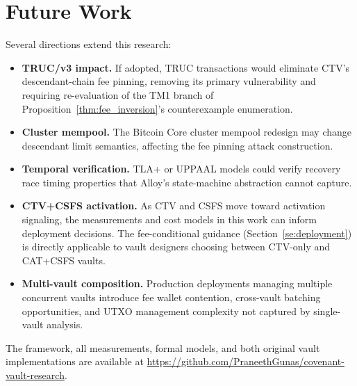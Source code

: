 \section{Future Work}

Several directions extend this research:

\begin{itemize}
\item \textbf{TRUC/v3 impact.} If adopted, TRUC transactions would eliminate CTV's
  descendant-chain fee pinning, removing its primary vulnerability and requiring
  re-evaluation of the TM1 branch of
  Proposition~\ref{thm:fee_inversion}'s counterexample enumeration.

\item \textbf{Cluster mempool.} The Bitcoin Core cluster mempool redesign may change
  descendant limit semantics, affecting the fee pinning attack construction.

\item \textbf{Temporal verification.} TLA+ or UPPAAL models could verify recovery
  race timing properties that Alloy's state-machine abstraction cannot capture.

\item \textbf{CTV+CSFS activation.} As CTV and CSFS move toward activation signaling,
  the measurements and cost models in this work can inform deployment decisions.
  The fee-conditional guidance (Section~\ref{se:deployment}) is directly applicable
  to vault designers choosing between CTV-only and CAT+CSFS vaults.

\item \textbf{Multi-vault composition.} Production deployments managing multiple
  concurrent vaults introduce fee wallet contention, cross-vault batching
  opportunities, and UTXO management complexity not captured by single-vault analysis.
\end{itemize}

The framework, all measurements, formal models, and both original vault
implementations are available at
\url{https://github.com/PraneethGunas/covenant-vault-research}.
